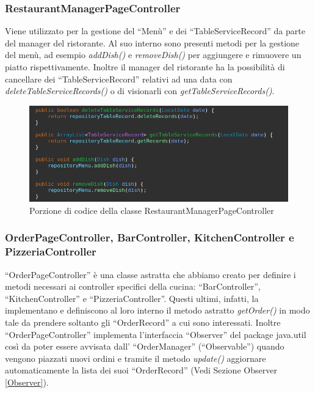 \documentclass{article}
\begin{document}
\newpage

\subsubsection{RestaurantManagerPageController}

Viene utilizzato per la gestione del ``Men\`u'' e dei ``TableServiceRecord'' da parte del manager del ristorante. Al suo interno sono presenti metodi per la gestione del men\`u, ad esempio \textit{addDish()} e \textit{removeDish()} per aggiungere e rimuovere un piatto rispettivamente. Inoltre il manager del ristorante ha la possibilit\`a di cancellare dei ``TableServiceRecord'' relativi ad una data con \textit{deleteTableServiceRecords()} o di visionarli con \textit{getTableServiceRecords()}.

\begin{figure}[!h]
\centering
\includegraphics[width= 12cm]{"Codice/ManagerPage.PNG"}
\caption{Porzione di codice della classe RestaurantManagerPageController}
\end{figure}

\newpage


\subsubsection{OrderPageController, BarController, KitchenController e PizzeriaController}

``OrderPageController'' \`e una classe astratta che abbiamo creato per definire i metodi necessari ai controller specifici della cucina: ``BarController'', ``KitchenController'' e ``PizzeriaController''. Questi ultimi, infatti, la implementano e definiscono al loro interno il metodo astratto \textit{getOrder()} in modo tale da prendere soltanto gli ``OrderRecord'' a cui sono interessati. Inoltre ``OrderPageController'' implementa l'interfaccia ``Observer'' del package java.util cos\`i da poter essere avvisata dall' ``OrderManager'' (``Observable'') quando vengono piazzati nuovi ordini e tramite il metodo \textit{update()} aggiornare automaticamente la lista dei suoi ``OrderRecord'' (Vedi Sezione Observer \ref{Observer}).
\end{document}
